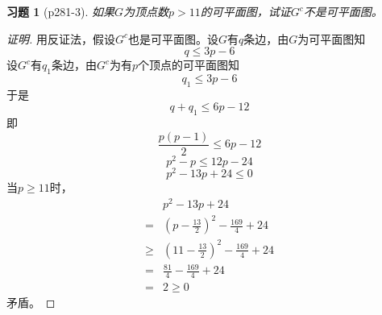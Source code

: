 \documentclass{article}
\begin{document}
\begin{CJK}{UTF8}{gbsn}
  \newtheorem*{Exercise}{习题}
\begin{Exercise}[p281-3]
  如果$G$为顶点数$p>11$的可平面图，试证$G^c$不是可平面图。
\end{Exercise}
\begin{proof}[证明]
    用反证法，假设$G^c$也是可平面图。设$G$有$q$条边，由$G$为可平面图知
  \[q \leq 3p - 6\]
  设$G^c$有$q_1$条边，由$G^c$为有$p$个顶点的可平面图知
  \[q_1 \leq 3p - 6\]
  于是
  \[q + q _1 \leq 6p-12\]
  即
  \[\frac{p(p-1)}{2} \leq 6p-12\]
  \[p^2-p \leq 12p-24\]
  \[p^2-13p+24 \leq 0\]
  当$p\geq 11$时，
  \begin{equation*}
    \begin{split}
     &p^2-13p+24\\
     =&(p-\frac{13}{2})^2-\frac{169}{4}+24\\
     \geq&(11-\frac{13}{2})^2-\frac{169}{4} + 24\\
     =&\frac{81}{4} - \frac{169}{4} + 24\\
     =&2 \geq 0
    \end{split}
  \end{equation*}
  矛盾。
\end{proof}

\end{CJK}
\end{document}
